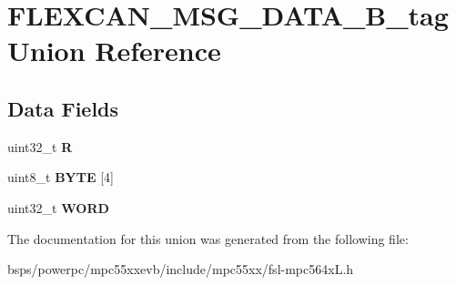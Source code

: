 \hypertarget{unionFLEXCAN__MSG__DATA__32B__tag}{}\section{F\+L\+E\+X\+C\+A\+N\+\_\+\+M\+S\+G\+\_\+\+D\+A\+T\+A\+\_\+B\+\_\+tag Union Reference}
\label{unionFLEXCAN__MSG__DATA__32B__tag}
\subsection*{Data Fields}
\begin{DoxyCompactItemize}
\item 
\mbox{\label{unionFLEXCAN__MSG__DATA__32B__tag_a66ab24bbf9354e587a9d08346df6266a}} 
uint32\+\_\+t {\bfseries R}
\item 
\mbox{\label{unionFLEXCAN__MSG__DATA__32B__tag_a83419c7cf52a1c052194f04f1f6a9409}} 
uint8\+\_\+t {\bfseries B\+Y\+TE} \mbox{[}4\mbox{]}
\item 
\mbox{\label{unionFLEXCAN__MSG__DATA__32B__tag_a65578790c8c0ce19f932b4a1287eb497}} 
uint32\+\_\+t {\bfseries W\+O\+RD}
\end{DoxyCompactItemize}


The documentation for this union was generated from the following file\+:\begin{DoxyCompactItemize}
\item 
bsps/powerpc/mpc55xxevb/include/mpc55xx/fsl-\/mpc564x\+L.\+h\end{DoxyCompactItemize}
